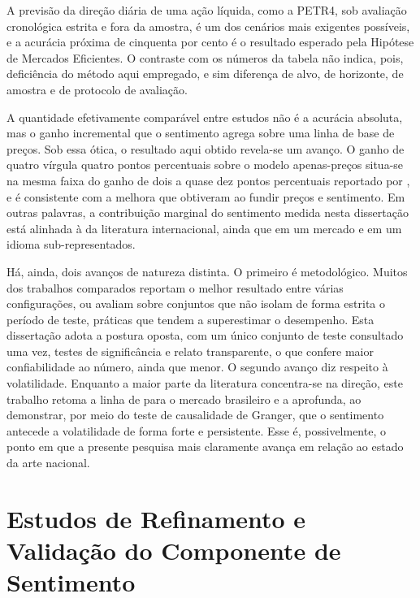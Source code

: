 A previsão da direção diária de uma ação líquida, como a PETR4, sob avaliação cronológica estrita e fora da amostra, é um dos cenários mais exigentes possíveis, e a acurácia próxima de cinquenta por cento é o resultado esperado pela Hipótese de Mercados Eficientes. O contraste com os números da tabela não indica, pois, deficiência do método aqui empregado, e sim diferença de alvo, de horizonte, de amostra e de protocolo de avaliação.

A quantidade efetivamente comparável entre estudos não é a acurácia absoluta, mas o ganho incremental que o sentimento agrega sobre uma linha de base de preços. Sob essa ótica, o resultado aqui obtido revela-se um avanço. O ganho de quatro vírgula quatro pontos percentuais sobre o modelo apenas-preços situa-se na mesma faixa do ganho de dois a quase dez pontos percentuais reportado por , e é consistente com a melhora que  obtiveram ao fundir preços e sentimento. Em outras palavras, a contribuição marginal do sentimento medida nesta dissertação está alinhada à da literatura internacional, ainda que em um mercado e em um idioma sub-representados.

Há, ainda, dois avanços de natureza distinta. O primeiro é metodológico. Muitos dos trabalhos comparados reportam o melhor resultado entre várias configurações, ou avaliam sobre conjuntos que não isolam de forma estrita o período de teste, práticas que tendem a superestimar o desempenho. Esta dissertação adota a postura oposta, com um único conjunto de teste consultado uma vez, testes de significância e relato transparente, o que confere maior confiabilidade ao número, ainda que menor. O segundo avanço diz respeito à volatilidade. Enquanto a maior parte da literatura concentra-se na direção, este trabalho retoma a linha de  para o mercado brasileiro e a aprofunda, ao demonstrar, por meio do teste de causalidade de Granger, que o sentimento antecede a volatilidade de forma forte e persistente. Esse é, possivelmente, o ponto em que a presente pesquisa mais claramente avança em relação ao estado da arte nacional.

\section{Estudos de Refinamento e Validação do Componente de Sentimento}
\label{sec:refinamento_validacao}

